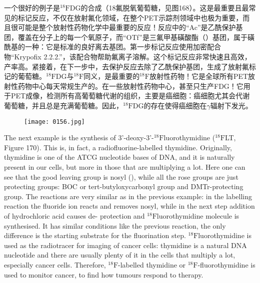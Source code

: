 \documentclass[dvipsnames, svgnames,a4paper,11pt]{article}
\begin{document}
一个很好的例子是${}^\mathrm{18}\mathrm{F}$DG的合成（18氟脱氧葡萄糖，见图168）。这是最重要且最常见的标记反应，不仅在放射氟化领域，在整个PET示踪剂领域中也极为重要，而且很可能是整个放射性药物化学中最重要的反应！反应中的“Ac”是乙酰保护基团，覆盖在分子上的每一个氧原子，而“OTf”是三氟甲基磺酸酯（）基团，属于磺酰基的一种：它是标准的良好离去基团。第一步标记反应使用加密配合物“Krypofix 2.2.2.”，该配合物帮助氟离子溶解。这个标记反应非常快速且高效，产率高。紧接着，在下一步中，去保护反应去除了乙酰保护基团，生成了放射氟标记的葡萄糖。${}^\mathrm{18}\mathrm{F}$DG与${}^\mathrm{18}\mathrm{F}$同义，是最重要的${}^\mathrm{18}\mathrm{F}$放射性药物！它是全球所有PET放射性药物中心每天常规生产的。在一些放射性药物中心，甚至只生产FDG！它用于PET成像，检测所有高葡萄糖代谢的组织，主要是癌细胞：癌细胞尤其会代谢葡萄糖，并且总是充满葡萄糖。因此，${}^\mathrm{18}\mathrm{F}$DG的存在使得癌细胞在$\gamma$辐射下发光。

\begin{figure}[h]
	\centering
    \texttt{[image: 0156.jpg]}    
     \label{fig170}
\end{figure}


The next example is the synthesis of 3’-deoxy-3’-${}^\mathrm{18}\mathrm{F}$luorothymidine (${}^\mathrm{18}\mathrm{F}$LT, Figure
170). This is, in fact, a radiofluorine-labelled thymidine. Originally, thymidine is one of
the ATCG nucleotide bases of DNA, and it is naturally present in our cells, but more
in those that are multiplying a lot. Here one can see that the good leaving group is
nosyl (), while all the rose groups are just protecting groups: BOC or
tert-butyloxycarbonyl group and DMTr-protecting group. The reactions are very
similar as in the previous example: in the labelling reaction the fluoride ion reacts
and removes nosyl, while in the next step addition of hydrochloric acid causes de-
protection and ${}^\mathrm{18}\mathrm{F}$luorothymidine molecule is synthesised. It has similar conditions like the previous reaction, the only difference is the starting substrate for the
fluorination step. ${}^\mathrm{18}\mathrm{F}$luorothymidine is used as the radiotracer for imaging of cancer
cells: thymidine is a natural DNA nucleotide and there are usually plenty of it in the
cells that multiply a lot, especially cancer cells. Therefore, ${}^\mathrm{18}\mathrm{F}$-labelled thymidine or
${}^\mathrm{18}\mathrm{F}$-fluorothymidine is used to monitor cancer, to find how tumours respond to
therapy.
\end{document}
